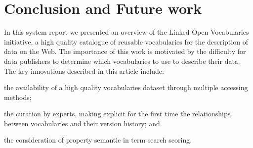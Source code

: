 \documentclass{iosart2c}
\begin{document}
		
%							
%   


\section{Conclusion and Future work}
\label{sec:conclusion}
In this system report we presented an overview of the Linked Open Vocabularies initiative, a high quality catalogue of reusable vocabularies for the description of data on the Web. The importance of this work is motivated by the difficulty for data publishers to determine which vocabularies to use to describe their data. The key innovations described in this article include: 
\begin{inparaenum}[1)] 
	\item the availability of a high quality vocabularies dataset through multiple accessing methods;
	\item the curation by experts, making explicit for the first time the relationships between vocabularies and their version history; and
	\item the consideration of property semantic in term search scoring.
\end{inparaenum}
\end{document}
